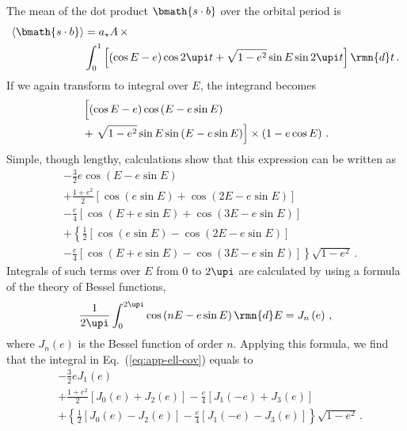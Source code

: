 \documentclass[fleqn,usenatbib,useAMS,usedcolumn]{mnras}
\begin{document}
The mean of the dot product $\bmath{s\cdot b}$ over the orbital period is
\begin{equation}\label{eq:app-ell-cov}
 \begin{aligned}
  \left\langle\bmath{s\cdot b}\right\rangle&=a_\star A\,\times\\&\int_0^1\left[\left(\cos E-e\right)\cos 2\upi t+\sqrt{1-e^2}\sin E\sin 2\upi t\right]\rmn{d}t\,.
 \end{aligned}
\end{equation}
If we again transform to integral over $E$, the integrand becomes
\begin{equation}
 \begin{aligned}
  &\left[\left(\cos E-e\right)\cos\left(E-e\sin E\right)\vphantom{\sqrt{e^2}}\right.\\
  &+\left.\sqrt{1-e^2}\sin E\sin\left(E-e\sin E\right)\right]\times\left(1-e\cos E\right)\,.
 \end{aligned}
\end{equation}
Simple, though lengthy, calculations show that this expression can be written as
\begin{equation}
 \begin{aligned}
  &-\frac{3}{2}e\cos\left(E-e\sin E\right)\\
  &+\frac{1+e^2}{2}\left[\cos\left(e\sin E\right)+\cos\left(2E-e\sin E\right)\right]\\
  &-\frac{e}{4}\left[\cos\left(E+e\sin E\right)+\cos\left(3E-e\sin E\right)\right]\\
  &+\left\{\frac{1}{2}\left[\cos\left(e\sin E\right)-
                            \cos\left(2E-e\sin E\right)
                     \right]\right.\\
  &\left.-\frac{e}{4}\left[\cos\left(E+e\sin E\right)-
                           \cos\left(3E-e\sin E\right)
                     \right]\right\}
  \sqrt{1-e^2}\,.
 \end{aligned}
\end{equation}
Integrals of such terms over $E$ from 0 to $2\upi$ are calculated by using a formula of the theory of Bessel functions,
\begin{equation}
  \frac{1}{2\upi}\int_0^{2\upi}\cos\left(nE-e\sin E\right)\rmn{d}E=J_n\left(e\right)\,,
\end{equation}
where $J_n\left(e\right)$ is the Bessel function of order $n$. Applying this formula, we find that the integral in Eq.~(\ref{eq:app-ell-cov}) equals to
\begin{equation}
 \begin{aligned}
  &-\frac{3}{2}eJ_1\left(e\right)\\
  &+\frac{1+e^2}{2}\left[J_0\left(e\right)+J_2\left(e\right)\right]
  -\frac{e}{4}\left[J_1\left(-e\right)+J_3\left(e\right)\right]\\
  &+\left\{\frac{1}{2}\left[J_0\left(e\right)-J_2\left(e\right)
                     \right]
  -\frac{e}{4}\left[J_1\left(-e\right)-J_3\left(e\right)
                     \right]\right\}
  \sqrt{1-e^2}\,.
 \end{aligned}
\end{equation}
\end{document}
